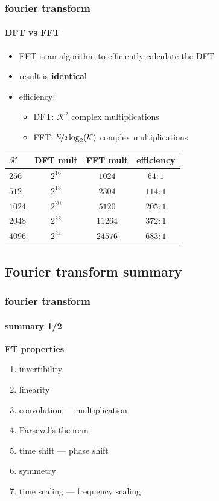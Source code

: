 	\begin{frame}\frametitle{fourier transform}\framesubtitle{DFT vs FFT}
        \begin{itemize}
            \item   FFT is an algorithm to efficiently calculate the DFT
            \item   result is \textbf{identical}
            \item   efficiency:
                \begin{itemize}
                    \item   DFT: $\mathcal{K}^2$ complex multiplications
                    \item   FFT: $\nicefrac{\mathcal{K}}{2}\log_2(\mathcal{K})$ complex multiplications
                \end{itemize}
        \end{itemize}
        
        \begin{table}
            \centering
                \begin{tabular}{l|ccc}
                    $\mathcal{K}$  & DFT mult & FFT mult & efficiency\\ \hline
                    
                    $256$ & $2^{16}$ & $1024$ & $64:1$\\
                    $512$ & $2^{18}$ & $2304$ & $114:1$\\
                    $1024$ & $2^{20}$ & $5120$ & $205:1$\\
                    $2048$ & $2^{22}$ & $11264$ & $372:1$\\
                    $4096$ & $2^{24}$ & $24576$ & $683:1$\\
                \end{tabular}
        \end{table}
	\end{frame}	
    
\subsection{Fourier transform summary}
	\begin{frame}\frametitle{fourier transform}\framesubtitle{summary 1/2}
        \textbf{FT properties}
        \begin{enumerate}
            \item   invertibility
            \item   linearity
            \item   convolution --- multiplication
            \item   Parseval's theorem
            \item   time shift --- phase shift
            \item   symmetry
            \item   time scaling --- frequency scaling
        \end{enumerate}
	\end{frame}	
    

